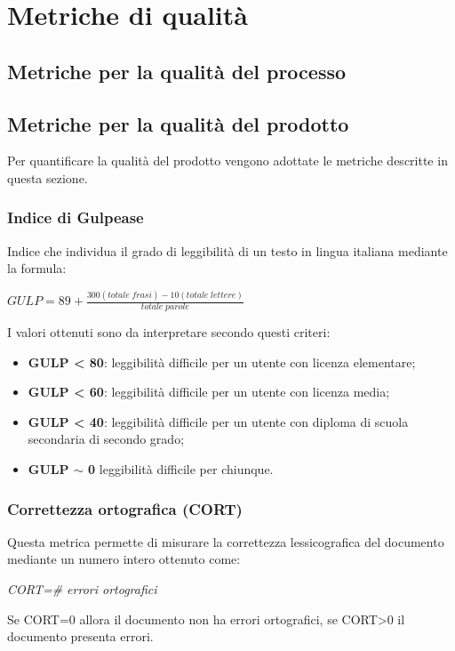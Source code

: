 \appendix
\section{Metriche di qualità}

\subsection{Metriche per la qualità del processo}

\subsection{Metriche per la qualità del prodotto} \label{_metricheprodotto}
Per quantificare la qualità del prodotto vengono adottate le metriche descritte in questa sezione.
\subsubsection{Indice di Gulpease} 
Indice che individua il grado di leggibilità di un testo in lingua italiana mediante la formula:
\begin{center}
    \(GULP=89+\frac{300(totale\; frasi)-10(totale\; lettere)}{totale\; parole}\)
\end{center}
I valori ottenuti sono da interpretare secondo questi criteri:
\begin{itemize}
    \item \textbf{GULP < 80}: leggibilità difficile per un utente con licenza elementare;
    \item \textbf{GULP < 60}: leggibilità difficile per un utente con licenza media;
    \item \textbf{GULP < 40}: leggibilità difficile per un utente con diploma di scuola secondaria di secondo grado;
    \item \textbf{GULP \(\sim\) 0} leggibilità difficile per chiunque.
\end{itemize}

\subsubsection{Correttezza ortografica (CORT)}
Questa metrica permette di misurare la correttezza lessicografica del documento mediante un numero intero ottenuto come:
\begin{center}
    \textit{CORT=\# errori ortografici}
\end{center}
Se CORT=0 allora il documento non ha errori ortografici, se CORT>0 il documento presenta errori.